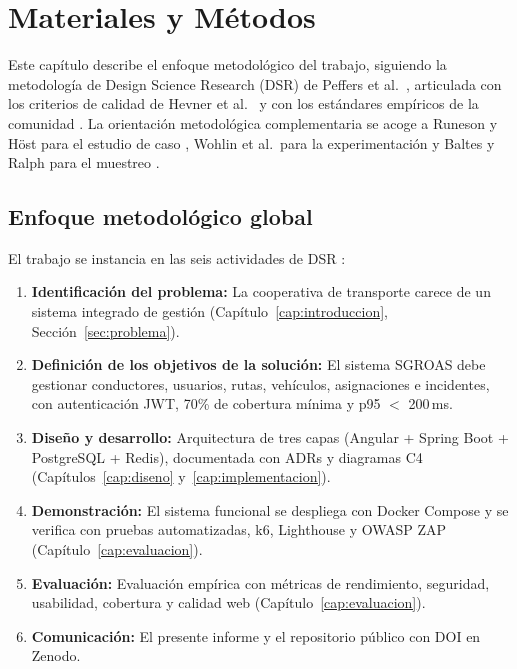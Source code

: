 \chapter{Materiales y Métodos}
\label{cap:metodos}

Este capítulo describe el enfoque metodológico del trabajo, siguiendo la metodología de Design Science Research (DSR) de Peffers et al.~\cite{peffers2007}, articulada con los criterios de calidad de Hevner et al.~\cite{hevner2004} y con los estándares empíricos de la comunidad \cite{ralph2021}. La orientación metodológica complementaria se acoge a Runeson y H\"ost para el estudio de caso \cite{runeson2009}, Wohlin et al.~para la experimentación \cite{wohlin2012} y Baltes y Ralph para el muestreo \cite{baltes2022}.

\section{Enfoque metodológico global}
\label{sec:dsr}

El trabajo se instancia en las seis actividades de DSR \cite{peffers2007}:

\begin{enumerate}
  \item \textbf{Identificación del problema:} La cooperativa de transporte carece de un sistema integrado de gestión (Capítulo~\ref{cap:introduccion}, Sección~\ref{sec:problema}).

  \item \textbf{Definición de los objetivos de la solución:} El sistema SGROAS debe gestionar conductores, usuarios, rutas, vehículos, asignaciones e incidentes, con autenticación JWT, 70\% de cobertura mínima y p95 $<$ 200\,ms.

  \item \textbf{Diseño y desarrollo:} Arquitectura de tres capas (Angular + Spring Boot + PostgreSQL + Redis), documentada con ADRs y diagramas C4 (Capítulos~\ref{cap:diseno} y~\ref{cap:implementacion}).

  \item \textbf{Demonstración:} El sistema funcional se despliega con Docker Compose y se verifica con pruebas automatizadas, k6, Lighthouse y OWASP ZAP (Capítulo~\ref{cap:evaluacion}).

  \item \textbf{Evaluación:} Evaluación empírica con métricas de rendimiento, seguridad, usabilidad, cobertura y calidad web (Capítulo~\ref{cap:evaluacion}).

  \item \textbf{Comunicación:} El presente informe y el repositorio público con DOI en Zenodo.
\end{enumerate}

